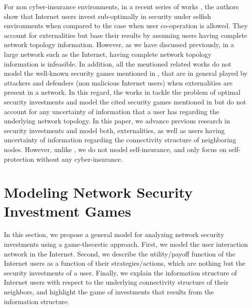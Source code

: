 \documentclass[letterpaper,12pt,onecolumn, nodraft]{IEEEtran}
\begin{document}
For non cyber-insurance environments, in a recent series of works \cite{jaw}\cite{oom}, the authors show that Internet users invest sub-optimally in security under selfish environments when compared to the case when user co-operation is allowed. They account for externalities but base their results by assuming users having complete network topology information. However, as we have discussed previously, in a large network such as the Internet, having complete network topology information is infeasible. In addition, all the mentioned related works do not model the well-known security games mentioned in \cite{hvar}, that are in general played by attackers and defenders (non malicious Internet users) when externalities are present in a network. In this regard, the works in \cite{zg}\cite{gccr1}\cite{gccr}  tackle the problem of optimal security investments and model the cited security games mentioned in \cite{hvar} but do not account for any uncertainty of information that a user has regarding the underlying network topology. In this paper, we advance previous research in security investments and model both, externalities, as well as users having uncertainty of information regarding the connectivity structure of neighboring nodes. However, unlike \cite{gccr1}\cite{gccr}, we do not model self-insurance, and only focus on self-protection without any cyber-insurance. 

\section{Modeling Network Security Investment Games}  \label{sec-model}
In this section, we propose a general model for analyzing network security investments using a game-theoretic approach. First, we model the user interaction network in the Internet. Second, we describe the utility/payoff function of the Internet users as a function of their strategies/actions, which are nothing but the security investments of a user. Finally, we explain the information structure of Internet users with respect to the underlying connectivity structure of their neighbors, and highlight the game of investments that results from the information structure. 
\end{document}

